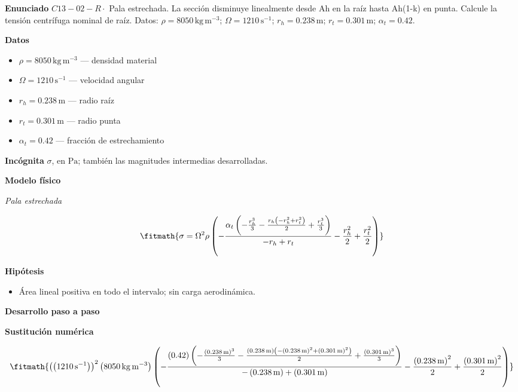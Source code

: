 \documentclass[10pt,openany]{book}
\begin{document}
\begin{tcolorbox}[title={Problema resuelto 2}, studiumworked, breakable]

\noindent\textbf{Enunciado}
\(C13-02-R \cdot\) Pala estrechada. La sección disminuye linealmente desde Ah en la raíz hasta Ah(1-k) en punta. Calcule la tensión centrífuga nominal de raíz. Datos: \(\rho=8050\, \mathrm{kg}\,\mathrm{m}^{-3}\); \(\Omega=1210\, \mathrm{s}^{-1}\); \(r_h=0.238\, \mathrm{m}\); \(r_t=0.301\, \mathrm{m}\); \(\alpha_t=0.42\).

\noindent\textbf{Datos}
\begin{itemize}
\item $\rho = 8050\,\mathrm{kg}\,\mathrm{m}^{-3}$ — densidad material
\item $\Omega = 1210\,\mathrm{s}^{-1}$ — velocidad angular
\item $r_h = 0.238\,\mathrm{m}$ — radio raíz
\item $r_t = 0.301\,\mathrm{m}$ — radio punta
\item $\alpha_t = 0.42$ — fracción de estrechamiento
\end{itemize}

\noindent\textbf{Incógnita}
$\sigma$, en $\mathrm{Pa}$; también las magnitudes intermedias desarrolladas.

\noindent\textbf{Modelo físico}

\noindent\textit{Pala estrechada}

\[
\fitmath{\sigma=\Omega^{2} \rho \left(- \frac{\alpha_t \left(- \frac{r_h^{3}}{3} - \frac{r_h \left(- r_h^{2} + r_t^{2}\right)}{2} + \frac{r_t^{3}}{3}\right)}{- r_h + r_t} - \frac{r_h^{2}}{2} + \frac{r_t^{2}}{2}\right)}
\]

\noindent\textbf{Hipótesis}
\begin{itemize}
\item Área lineal positiva en todo el intervalo; sin carga aerodinámica.
\end{itemize}

\noindent\textbf{Desarrollo paso a paso}



\noindent\textbf{Sustitución numérica}

\[
\fitmath{\left(\left(1210\,\mathrm{s}^{-1}\right)\right)^{2} \left(8050\,\mathrm{kg}\,\mathrm{m}^{-3}\right) \left(- \frac{\left(0.42\right) \left(- \frac{\left(0.238\,\mathrm{m}\right)^{3}}{3} - \frac{\left(0.238\,\mathrm{m}\right) \left(- \left(0.238\,\mathrm{m}\right)^{2} + \left(0.301\,\mathrm{m}\right)^{2}\right)}{2} + \frac{\left(0.301\,\mathrm{m}\right)^{3}}{3}\right)}{- \left(0.238\,\mathrm{m}\right) + \left(0.301\,\mathrm{m}\right)} - \frac{\left(0.238\,\mathrm{m}\right)^{2}}{2} + \frac{\left(0.301\,\mathrm{m}\right)^{2}}{2}\right)}
\]


\end{tcolorbox}
\end{document}
